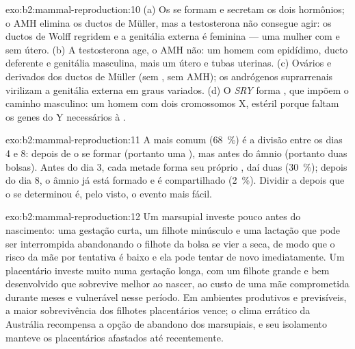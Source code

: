 \begin{solution}{exo:b2:mammal-reproduction:10}
(a) Os  se formam e secretam os dois hormônios; o AMH
elimina os ductos de Müller, mas a testosterona não consegue agir: os
ductos de Wolff regridem e a genitália externa é feminina --- uma
mulher com  e sem útero. (b) A testosterona age, o AMH não:
um homem com epidídimo, ducto deferente e genitália masculina, mais um
útero e tubas uterinas. (c) Ovários e derivados dos ductos de Müller
(sem , sem AMH); os andrógenos suprarrenais virilizam a
genitália externa em graus variados. (d) O \emph{SRY} forma
, que impõem o caminho masculino: um homem com dois
cromossomos X, estéril porque faltam os genes do Y necessários à
.
\end{solution}

\begin{solution}{exo:b2:mammal-reproduction:11}
A mais comum (\qty{68}{\%}) é a divisão entre os dias 4 e 8: depois
de o  se formar (portanto uma ), mas antes do âmnio
(portanto duas bolsas). Antes do dia 3, cada metade forma seu próprio
, daí duas  (\qty{30}{\%}); depois do dia 8, o
âmnio já está formado e é compartilhado (\qty{2}{\%}). Dividir a  depois que o  se determinou é, pelo visto,
o evento mais fácil.
\end{solution}

\begin{solution}{exo:b2:mammal-reproduction:12}
Um marsupial investe pouco antes do nascimento: uma gestação curta, um
filhote minúsculo e uma lactação que pode ser interrompida
abandonando o filhote da bolsa se vier a seca, de modo que o risco da
mãe por tentativa é baixo e ela pode tentar de novo imediatamente. Um
placentário investe muito numa gestação longa, com um filhote grande e
bem desenvolvido que sobrevive melhor ao nascer, ao custo de uma mãe
comprometida durante meses e vulnerável nesse período. Em ambientes
produtivos e previsíveis, a maior sobrevivência dos filhotes
placentários vence; o clima errático da Austrália recompensa a opção
de abandono dos marsupiais, e seu isolamento manteve os placentários
afastados até recentemente.
\end{solution}

